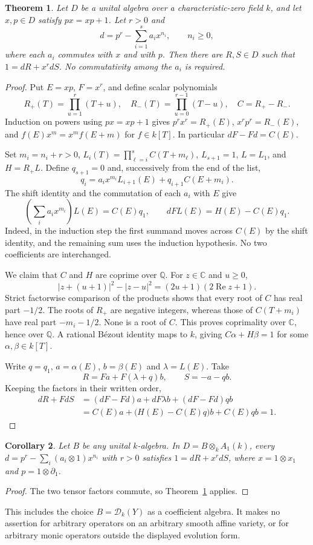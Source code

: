 \documentclass[11pt]{amsart}
\newtheorem{theorem}{Theorem}[section]
\newtheorem{corollary}[theorem]{Corollary}
\theoremstyle{definition}
\begin{document}
\begin{theorem}\label{thm:evolutionary}
Let $D$ be a unital algebra over a characteristic-zero field $k$, and let
$x,p\in D$ satisfy $px=xp+1$. Let $r>0$ and
\[
 d=p^r-\sum_{i=1}^s a_i x^{n_i},\qquad n_i\ge0,
\]
where each $a_i$ commutes with $x$ and with $p$.
Then there are $R,S\in D$ such that $1=dR+x^r dS$.
No commutativity among the $a_i$ is required.
\end{theorem}
\begin{proof}
Put $E=xp$, $F=x^r$, and define scalar polynomials
\[
 R_+(T)=\prod_{u=1}^r(T+u),\quad
 R_-(T)=\prod_{u=0}^{r-1}(T-u),\quad C=R_+-R_- .
\]
Induction on powers using $px=xp+1$ gives
$p^r x^r=R_+(E)$, $x^r p^r=R_-(E)$, and
$f(E)x^m=x^m f(E+m)$ for $f\in k[T]$.
In particular $dF-Fd=C(E)$.

Set $m_i=n_i+r>0$, $L_i(T)=\prod_{\ell=i}^s C(T+m_\ell)$,
$L_{s+1}=1$, $L=L_1$, and $H=R_+L$.
Define $q_{s+1}=0$ and, successively from the end of the list,
\[
 q_i=a_i x^{m_i}L_{i+1}(E)+q_{i+1}C(E+m_i).
\]
The shift identity and the commutation of each $a_i$ with $E$ give
\[
 \left(\sum_i a_i x^{m_i}\right)L(E)=C(E)q_1,\qquad
 dF L(E)=H(E)-C(E)q_1.
\]
Indeed, in the induction step the first summand moves across $C(E)$
by the shift identity, and the remaining sum uses the induction hypothesis.
No two coefficients are interchanged.

We claim that $C$ and $H$ are coprime over $\mathbb Q$.
For $z\in\mathbb C$ and $u\ge0$,
\[
 |z+(u+1)|^2-|z-u|^2=(2u+1)(2\operatorname{Re}z+1).
\]
Strict factorwise comparison of the products shows that every root of $C$
has real part $-1/2$. The roots of $R_+$ are negative integers, whereas
those of $C(T+m_i)$ have real part $-m_i-1/2$.
None is a root of $C$. This proves coprimality over $\mathbb C$, hence over
$\mathbb Q$. A rational B\'ezout identity maps to $k$, giving
$C\alpha+H\beta=1$ for some $\alpha,\beta\in k[T]$.

Write $q=q_1$, $a=\alpha(E)$, $b=\beta(E)$ and $\lambda=L(E)$.
Take
\[
 R=Fa+F(\lambda+q)b,\qquad S=-a-qb.
\]
Keeping the factors in their written order,
\[
\begin{aligned}
 dR+FdS
  &=(dF-Fd)a+dF\lambda b+(dF-Fd)qb\\
  &=C(E)a+\bigl(H(E)-C(E)q\bigr)b+C(E)qb=1.
\end{aligned}
\]
\end{proof}

\begin{corollary}\label{cor:tensor-evolution}
Let $B$ be any unital $k$-algebra. In $D=B\otimes_k A_1(k)$, every
$d=p^r-\sum_i(a_i\otimes1)x^{n_i}$ with $r>0$ satisfies
$1=dR+x^r dS$, where $x=1\otimes x_1$ and $p=1\otimes\partial_1$.
\end{corollary}
\begin{proof}
The two tensor factors commute, so Theorem~\ref{thm:evolutionary} applies.
\end{proof}

This includes the choice $B=\mathcal D_k(Y)$ as a coefficient algebra.
It makes no assertion for arbitrary operators on an arbitrary smooth affine
variety, or for arbitrary monic operators outside the displayed evolution form.

\clearpage


\end{document}
